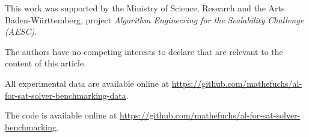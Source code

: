 \documentclass[sn-basic, Numbered]{sn-jnl} %
\begin{document}

This work was supported by the Ministry of Science, Research and the Arts Baden-Württemberg, project \emph{Algorithm Engineering for the Scalability Challenge (AESC)}.


The authors have no competing interests to declare that are relevant to the content of this article.


All experimental data are available online at \url{https://github.com/mathefuchs/al-for-sat-solver-benchmarking-data}.


The code is available online at \url{https://github.com/mathefuchs/al-for-sat-solver-benchmarking}.


\end{document}
